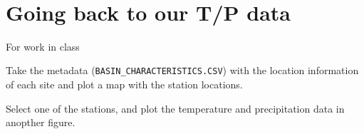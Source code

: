 \documentclass[11pt]{article}
\begin{document}
    \begin{center}
    \end{center}
    { \hspace*{\fill} \\}
    
    \hypertarget{going-back-to-our-tp-data}{%
\section{Going back to our T/P data}\label{going-back-to-our-tp-data}}

For work in class

Take the metadata (\texttt{BASIN\_CHARACTERISTICS.CSV}) with the
location information of each site and plot a map with the station
locations.

Select one of the stations, and plot the temperature and precipitation
data in anopther figure.
\end{document}
